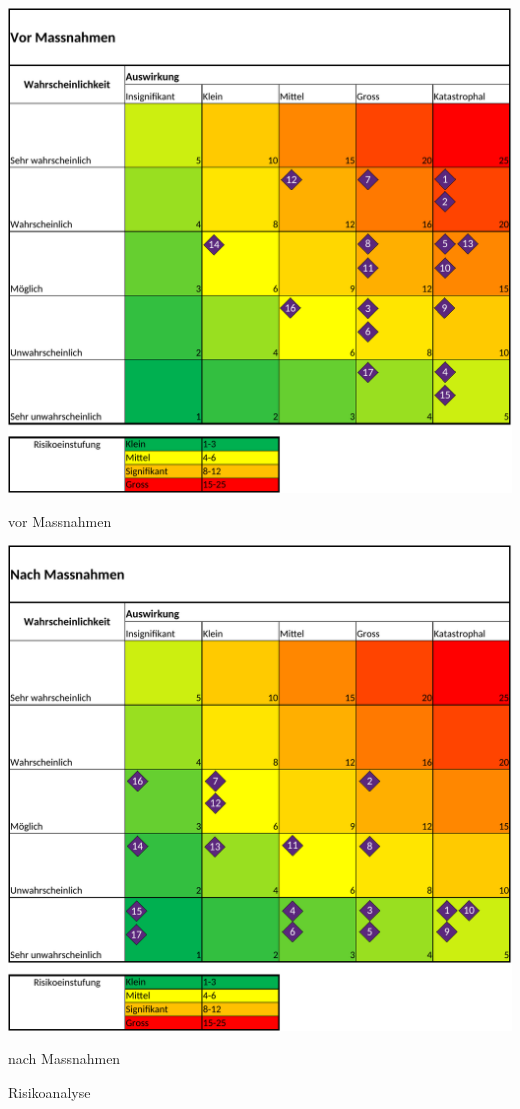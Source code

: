 \begin{table}[H]
\begin{subtable}{0.5\textwidth}
\includegraphics[width=0.99\linewidth]{assets/Risikoanalyse_vor_Massnahmen.pdf}
\caption{vor Massnahmen}
\label{table:risk-before}
\end{subtable}
\begin{subtable}{0.5\textwidth}
\includegraphics[width=0.99\linewidth]{assets/Risikoanalyse_nach_Massnahmen.pdf}
\caption{nach Massnahmen}
\label{table:risk-after}
\end{subtable}
\caption{Risikoanalyse}
\label{table:risk-table}
\end{table}

